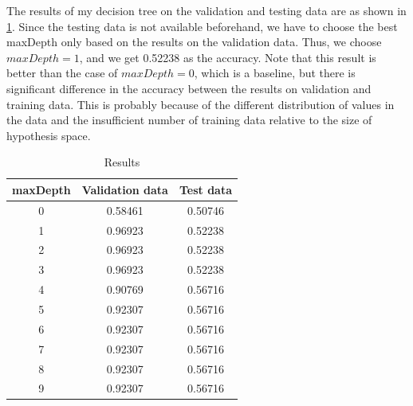 \begin{enumerate}
The results of my decision tree on the validation and testing data are as shown in \ref{tab:result}. Since the testing data is not available beforehand, we have to choose the best maxDepth only based on the results on the validation data. Thus, we choose $maxDepth=1$, and we get 0.52238 as the accuracy. Note that this result is better than the case of $maxDepth=0$, which is a baseline, but there is significant difference in the accuracy between the results on validation and training data. This is probably because of the different distribution of values in the data and the insufficient number of training data relative to the size of hypothesis space.
\begin{table}[htb]
\begin{center}
\caption{Results}
\begin{tabular}{|c|c|c|} \hline
maxDepth & Validation data & Test data \\ \hline \hline
0 & 0.58461 & 0.50746 \\ \hline
1 & 0.96923 & 0.52238 \\ \hline
2 & 0.96923 & 0.52238 \\ \hline
3 & 0.96923 & 0.52238 \\ \hline
4 & 0.90769 & 0.56716 \\ \hline
5 & 0.92307 & 0.56716 \\ \hline
6 & 0.92307 & 0.56716 \\ \hline
7 & 0.92307 & 0.56716 \\ \hline
8 & 0.92307 & 0.56716 \\ \hline
9 & 0.92307 & 0.56716 \\ \hline
\end{tabular}
\label{tab:result}
\end{center}
\end{table}

\end{enumerate}



